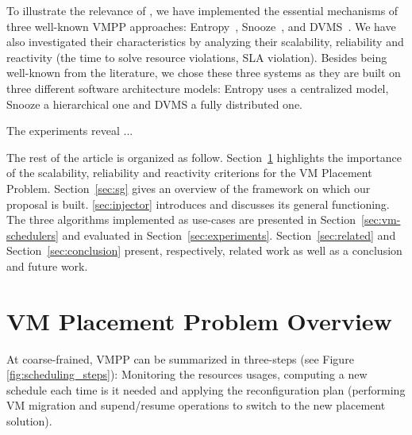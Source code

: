To illustrate the relevance of \vmps, we have implemented the
essential mechanisms of three well-known VMPP approaches:
Entropy~\cite{Hermenier:2009:ECM:1508293.1508300},
Snooze~\cite{feller:ccgrid12}, and DVMS~\cite{quesnel:cpe2012}. We
have also investigated their characteristics by analyzing their
scalability, reliability and reactivity (\ie the time to solve resource
violations, \aka SLA violation). Besides being well-known from the literature, we chose
these three systems as they are built on three different software
architecture models: Entropy uses a centralized model, Snooze a
hierarchical one and DVMS a fully distributed one.

The experiments reveal ...

The rest of the article is
organized as follow. Section~\ref{sec:vmpp} highlights the importance
of the scalability, reliability and reactivity criterions for the VM
Placement Problem.
Section~\ref{sec:sg} gives an overview of the \sg
framework on which our proposal is built. \ref{sec:injector}
introduces \vmps and discusses its general functioning. The three
algorithms implemented as use-cases are presented in
Section~\ref{sec:vm-schedulers} and evaluated in
Section~\ref{sec:experiments}. Section~\ref{sec:related} and
Section~\ref{sec:conclusion} present, respectively, related work as
well as a conclusion and future work.

\section{VM Placement Problem Overview}
\label{sec:vmpp}

At coarse-frained, VMPP can be summarized in
three-steps (see Figure \ref{fig:scheduling_steps}):  Monitoring the
resources usages, computing a new schedule each time is it  needed and applying the
reconfiguration plan (\ie performing VM migration and supend/resume
operations to switch to the new placement solution).

